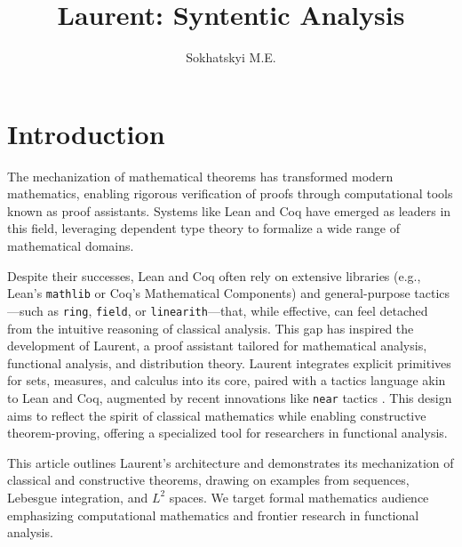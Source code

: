 \documentclass[12pt,twoside,draft]{cmpart}
\author{Sokhatskyi M.E.}
\title{Laurent: Syntentic Analysis}
\institute{Groupoid Infinity, Laboratory of National Technical University of Ukraine, м. Київ, Україна, 03056,
  Політехнічна вул. 14-А, корпус 14 (прикладної математики)}
\begin{document}
\maketitle


\section{Introduction}
The mechanization of mathematical theorems has transformed modern mathematics,
enabling rigorous verification of proofs through computational tools known as
proof assistants. Systems like Lean and Coq have emerged as leaders in this field,
leveraging dependent type theory to formalize a wide range of mathematical domains.

Despite their successes, Lean and Coq often rely on extensive libraries (e.g., Lean’s \texttt{mathlib}
or Coq’s Mathematical Components) and general-purpose tactics—such as \texttt{ring}, \texttt{field},
or \texttt{linearith}—that, while effective, can feel detached
from the intuitive reasoning of classical analysis. This gap has
inspired the development of Laurent, a proof assistant tailored
for mathematical analysis, functional analysis, and distribution theory.
Laurent integrates explicit primitives for sets, measures, and calculus
into its core, paired with a tactics language akin to Lean and Coq, augmented
by recent innovations like \texttt{near} tactics \cite{af18}. This design aims
to reflect the spirit of classical mathematics while enabling constructive
theorem-proving, offering a specialized tool for researchers in functional analysis.

This article outlines Laurent’s architecture and demonstrates its mechanization
of classical and constructive theorems, drawing on examples from sequences,
Lebesgue integration, and $L^2$ spaces. We target formal mathematics audience
emphasizing computational mathematics and frontier research in functional analysis.
\end{document}

